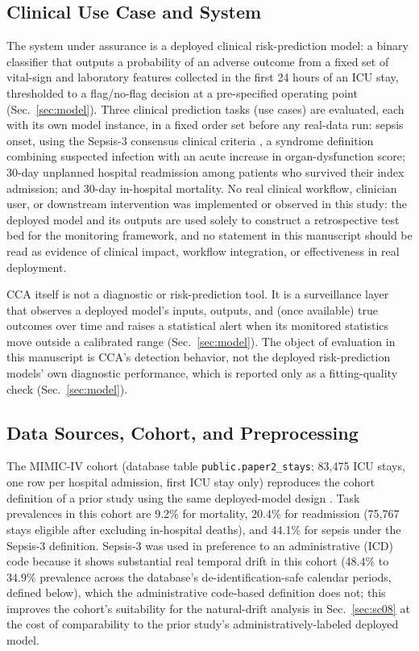 \documentclass[apajournal,article,submit,oneauthor]{Definitions/mdpi}
\begin{document}
\subsection{Clinical Use Case and System}

The system under assurance is a deployed clinical risk-prediction model: a binary classifier that outputs a probability of an adverse outcome from a fixed set of vital-sign and laboratory features collected in the first 24 hours of an ICU stay, thresholded to a flag/no-flag decision at a pre-specified operating point (Sec.~\ref{sec:model}). Three clinical prediction tasks (use cases) are evaluated, each with its own model instance, in a fixed order set before any real-data run: sepsis onset, using the Sepsis-3 consensus clinical criteria \citep{singer2016}, a syndrome definition combining suspected infection with an acute increase in organ-dysfunction score; 30-day unplanned hospital readmission among patients who survived their index admission; and 30-day in-hospital mortality. No real clinical workflow, clinician user, or downstream intervention was implemented or observed in this study: the deployed model and its outputs are used solely to construct a retrospective test bed for the monitoring framework, and no statement in this manuscript should be read as evidence of clinical impact, workflow integration, or effectiveness in real deployment.

CCA itself is not a diagnostic or risk-prediction tool. It is a surveillance layer that observes a deployed model's inputs, outputs, and (once available) true outcomes over time and raises a statistical alert when its monitored statistics move outside a calibrated range (Sec.~\ref{sec:model}). The object of evaluation in this manuscript is CCA's detection behavior, not the deployed risk-prediction models' own diagnostic performance, which is reported only as a fitting-quality check (Sec.~\ref{sec:model}).

\subsection{Data Sources, Cohort, and Preprocessing}\label{sec:cohort}

The MIMIC-IV cohort (database table \texttt{public.paper2\_stays}; 83{,}475 ICU stays, one row per hospital admission, first ICU stay only) reproduces the cohort definition of a prior study using the same deployed-model design \citep{yu2026deferral}. Task prevalences in this cohort are 9.2\% for mortality, 20.4\% for readmission (75{,}767 stays eligible after excluding in-hospital deaths), and 44.1\% for sepsis under the Sepsis-3 definition. Sepsis-3 was used in preference to an administrative (ICD) code because it shows substantial real temporal drift in this cohort (48.4\% to 34.9\% prevalence across the database's de-identification-safe calendar periods, defined below), which the administrative code-based definition does not; this improves the cohort's suitability for the natural-drift analysis in Sec.~\ref{sec:sc08} at the cost of comparability to the prior study's administratively-labeled deployed model.
\end{document}
